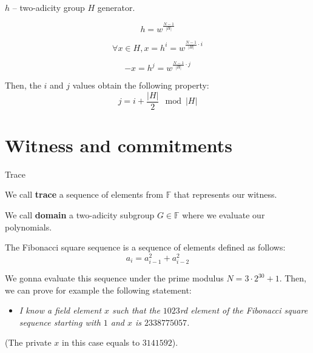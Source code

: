 \documentclass{zkdl-presentation-template}
\begin{document}
\begin{frame}
    $h$ -- two-adicity group $H$ generator. 

    \begin{equation*}
        h = w^{\frac{N - 1}{|H|}}    
    \end{equation*}

    \begin{equation*}
        \forall x \in H, x = h^i = w^{\frac{N - 1}{|H|} \cdot i}
    \end{equation*}

    \begin{equation*}
        -x = h^j = w^{\frac{N - 1}{|H|} \cdot j}
    \end{equation*}

    Then, the $i$ and $j$ values obtain the following property: 
    \begin{equation*}
        j = i + \frac{|H|}{2} \mod |H|   
    \end{equation*}    

\end{frame}

\section{Witness and commitments}

\begin{frame}{Trace}
    \begin{definition}
        We call \textbf{trace} a sequence of elements from $\mathbb{F}$ that represents our witness.
    \end{definition}

    \begin{definition}
        We call \textbf{domain} a two-adicity subgroup $G \in \mathbb{F}$ where we evaluate our polynomials.
    \end{definition}
\end{frame}

\begin{frame}
    \begin{example}
        The Fibonacci square sequence is a sequence of elements defined as follows:
        \begin{equation*}
        a_{i} = a_{i-1}^2 + a_{i-2}^2  
        \end{equation*}

        We gonna evaluate this sequence under the prime modulus $N = 3\cdot 2^{30} + 1$. Then, we can prove for example the following statement:
        \begin{itemize}
            \item \textit{I know a field element $x$ such that the $1023$rd element of the Fibonacci square sequence starting with $1$ and $x$ is $2338775057$.} 
        \end{itemize}

        (The private $x$ in this case equals to $3141592$).
    \end{example}
\end{frame}
\end{document}
